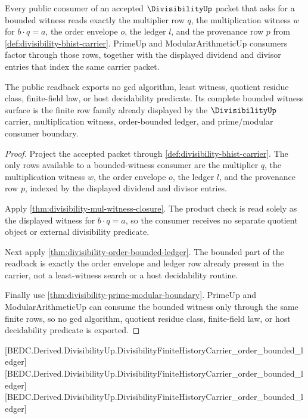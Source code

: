 \begin{theorem}
\label{thm:divisibility-bounded-witness-public-readback}
Every public consumer of an accepted $\DivisibilityUp$ packet that asks for a
bounded witness reads exactly the multiplier row $q$, the multiplication
witness $w$ for $b\cdot q=a$, the order envelope $o$, the ledger $l$, and the
provenance row $p$ from \autoref{def:divisibility-bhist-carrier}. PrimeUp and
ModularArithmeticUp consumers factor through those rows, together with the
displayed dividend and divisor entries that index the same carrier packet.

The public readback exports no gcd algorithm, least witness, quotient residue
class, finite-field law, or host decidability predicate. Its complete bounded
witness surface is the finite row family already displayed by the
$\DivisibilityUp$ carrier, multiplication witness, order-bounded ledger, and
prime/modular consumer boundary.
\end{theorem}
\begin{proof}
Project the accepted packet through \autoref{def:divisibility-bhist-carrier}.
The only rows available to a bounded-witness consumer are the multiplier $q$,
the multiplication witness $w$, the order envelope $o$, the ledger $l$, and the
provenance row $p$, indexed by the displayed dividend and divisor entries.

Apply \autoref{thm:divisibility-mul-witness-closure}. The product check is read
solely as the displayed witness for $b\cdot q=a$, so the consumer receives no
separate quotient object or external divisibility predicate.

Next apply \autoref{thm:divisibility-order-bounded-ledger}. The bounded part of
the readback is exactly the order envelope and ledger row already present in
the carrier, not a least-witness search or a host decidability routine.

Finally use \autoref{thm:divisibility-prime-modular-boundary}. PrimeUp and
ModularArithmeticUp can consume the bounded witness only through the same
finite rows, so no gcd algorithm, quotient residue class, finite-field law, or
host decidability predicate is exported.
\end{proof}

[BEDC.Derived.DivisibilityUp.DivisibilityFiniteHistoryCarrier\_order\_bounded\_ledger]
[BEDC.Derived.DivisibilityUp.DivisibilityFiniteHistoryCarrier\_order\_bounded\_ledger]
[BEDC.Derived.DivisibilityUp.DivisibilityFiniteHistoryCarrier\_order\_bounded\_ledger]

